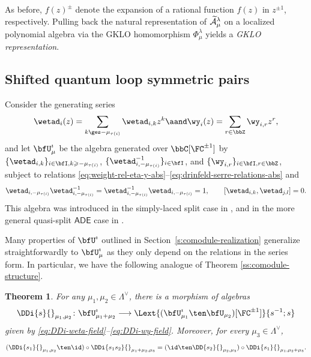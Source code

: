 \documentclass[reqno]{amsart}
\numberwithin{equation}{section}
\newtheorem*{theorem}{Theorem}
\begin{document}
As before, $f(z)^\pm$ denote the expansion of a rational function $f(z)$ in $z^{\pm 
	1}$, respectively. 
Pulling back the natural representation of $\widetilde{\mathcal{A}}^\lambda_\mu$ on a localized polynomial algebra via the GKLO homomorphism ${\Phi}^{\lambda}_\mu$ yields a \emph{GKLO representation}.  

\subsection{Shifted quantum loop symmetric pairs} \label{ss: sh iloop thm}

Consider the generating series 
\begin{equation}
	\wetad_{i}(z)=\sum_{k\ges - \mu_{\tau(i)}}\wetad_{i,k}z^k \aand \wy_i(z) = 
	\sum_{r\in\bbZ}\wy_{i,r}z^r,
\end{equation}
and let $\bfU^\imath_\mu$ be the algebra generated over $\bbC[\FC^{\pm1}]$ by 
$\{\wetad_{i,k}\}_{i\in\bfI,k\geqslant - \mu_{\tau(i)}}$, 
$\{\wetad_{i,-\mu_{\tau(i)}}^{-1}\}_{i\in\bfI}$, and $\{\wy_{i,r}\}_{i\in\bfI,r\in\bbZ}$, 
subject to relations 
\eqref{eq:weight-rel-eta-y-abs}--\eqref{eq:drinfeld-serre-relations-abs} and 
\[
\wetad_{i,- \mu_{\tau(i)}}\wetad_{i,- \mu_{\tau(i)}}^{-1}=\wetad_{i,- 
	\mu_{\tau(i)}}^{-1}\wetad_{i,- \mu_{\tau(i)}}=1, \qquad
[\wetad_{i,k},\wetad_{j,l}]=0.
\]
This algebra was introduced in the simply-laced split case in \cite{LP-gklo}, and in the 
more general quasi-split $\mathsf{ADE}$ case in \cite{lu-wang-weekes-26}. 

Many properties of $\bfU^\imath$ outlined in Section~\ref{s:comodule-realization} 
generalize straightforwardly to $\bfU^\imath_\mu$ as they only depend on the relations 
in the series form. In particular, we have the following analogue of Theorem 
\ref{ss:comodule-structure}. 

\begin{theorem}\label{thm:shifted-coaction}
	For any $\mu_1, \mu_2 \in \Lambda^\vee$, there is a morphism of algebras
	\[
	\DDi{s}{}_{\mu_1,\mu_2} \colon\bfU^\imath_{\mu_1+\mu_2} \longrightarrow
	\Lext{(\bfU^\imath_{\mu_1}\ten\bfU_{\mu_2})[\FC^{\pm1}]}{s^{-1};s}
	\]
	given by \eqref{eq:DDi-weta-field}--\eqref{eq:DDi-wy-field}. 
	Moreover, for every $\mu_3\in\Lambda^\vee$,
	\begin{equation}
		(\DDi{s_1}{}_{\mu_1,\mu_2}\ten\id)\circ\DDi{s_1s_2}{}_{\mu_1+\mu_2,\mu_3}
		=(\id\ten\DD{s_2}{}_{\mu_2,\mu_3})\circ\DDi{s_1}{}_{\mu_1,\mu_2+\mu_3}.
		\label{app:coassociativity}
	\end{equation}
\end{theorem} 
\end{document}
